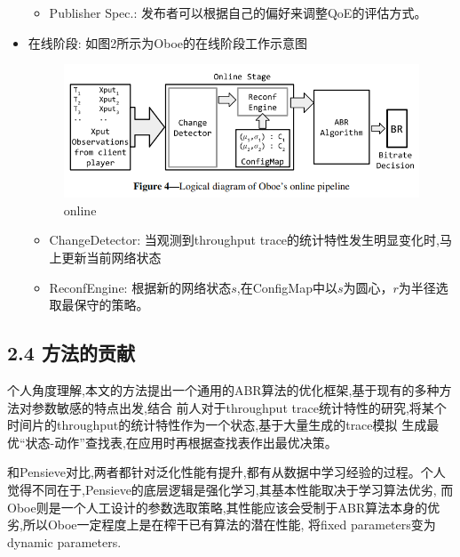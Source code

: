 \documentclass{\SetClass}
\begin{document}
\begin{itemize}
\begin{itemize}
            \item Publisher Spec.: 发布者可以根据自己的偏好来调整QoE的评估方式。
        \end{itemize}


        \item 在线阶段: 如图2所示为Oboe的在线阶段工作示意图
        \begin{figure}[!h]
            \centering
            \includegraphics[scale=0.6]{./Fig/online.png}
            \caption{online}
            \label{fig:2}
        \end{figure}
        \begin{itemize}
            \item ChangeDetector: 当观测到throughput trace的统计特性发生明显变化时,马上更新当前网络状态
            
            \item ReconfEngine: 根据新的网络状态$s$,在ConfigMap中以$s$为圆心，$r$为半径选取最保守的策略。
            
        \end{itemize}
    \end{itemize}


    \subsection*{2.4 方法的贡献}
    \par 个人角度理解,本文的方法提出一个通用的ABR算法的优化框架,基于现有的多种方法对参数敏感的特点出发,结合
    前人对于throughput trace统计特性的研究,将某个时间片的throughput的统计特性作为一个状态,基于大量生成的trace模拟
    生成最优“状态-动作”查找表,在应用时再根据查找表作出最优决策。

    \par 和Pensieve对比,两者都针对泛化性能有提升,都有从数据中学习经验的过程。个人觉得不同在于,Pensieve的底层逻辑是强化学习,其基本性能取决于学习算法优劣,
    而Oboe则是一个人工设计的参数选取策略,其性能应该会受制于ABR算法本身的优劣,所以Oboe一定程度上是在榨干已有算法的潜在性能,
    将fixed parameters变为dynamic parameters.
\end{document}
